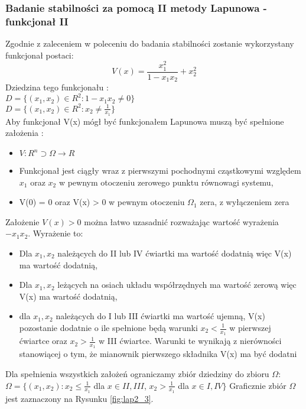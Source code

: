 \documentclass[a4paper,11pt]{article}
\begin{document}
\subsubsection{Badanie stabilności za pomocą II metody Lapunowa - funkcjonał II}
Zgodnie z zaleceniem w poleceniu do badania stabilności zostanie wykorzystany funkcjonał postaci:
\begin{equation*}
V(x)=\frac{x_{1}^{2}}{1-x_{1}x_{2}}+x_{2}^{2}
\end{equation*}
Dziedzina tego funkcjonału : \\
\( D = \{ (x_{1},x_{2}) \in R^{2} : 1-x_{1}x_{2} \neq 0 \} \) \\
\( D = \{ (x_{1},x_{2}) \in R^{2} : x_{2} \neq \frac{1}{x_{1}} \} \) 
\\
Aby funkcjonał V(x) mógł być funkcjonałem Lapunowa muszą być spełnione założenia : 
\begin{itemize}
\item \( V : R^{n} \supset \Omega \rightarrow R \)
\item Funkcjonał jest ciągły wraz z pierwszymi pochodnymi cząstkowymi względem \(x_{1}\) oraz \(x_{2}\) w pewnym otoczeniu zerowego punktu równowagi systemu, 
\item V(0) = 0 oraz V(x) > 0 w pewnym otoczeniu \(\Omega_{1}\) zera, z wyłączeniem zera 
\end{itemize}
Założenie \( V(x)>0 \) można łatwo uzasadnić rozważając wartość wyrażenia \( -x_{1}x_{2} \). Wyrażenie to:
\begin{itemize}
\item Dla \(x_{1}, x_{2} \) należących do II lub IV ćwiartki ma wartość dodatnią więc V(x) ma wartość dodatnią,
\item Dla \(x_{1}, x_{2} \) leżących na osiach układu współrzędnych ma wartość zerową więc V(x) ma wartość dodatnią,
\item dla \(x_{1}, x_{2} \) należących do I lub III ćwiartki ma wartość ujemną, V(x) pozostanie dodatnie o ile spełnione będą warunki \(x_{2}<\frac{1}{x_{1}} \) w pierwszej ćwiartce oraz \(x_{2}>\frac{1}{x_{1}}\) w III ćwiartce. Warunki te wynikają z nierówności stanowiącej o tym, że mianownik pierwszego składnika V(x) ma być dodatni  
\end{itemize}
Dla spełnienia wszystkich założeń ograniczamy zbiór dziedziny do zbioru \( \Omega \): \\
\( \Omega = \{ (x_{1},x_{2}): x_{2} \leq \frac{1}{x_{1}} \) dla \( x \in II,III \), \( x_{2}>\frac{1}{x_{1}} \) dla \( x \in I,IV \} \)
Graficznie zbiór \( \Omega \) jest zaznaczony na Rysunku \ref{fig:lap2_3}.
\end{document}

